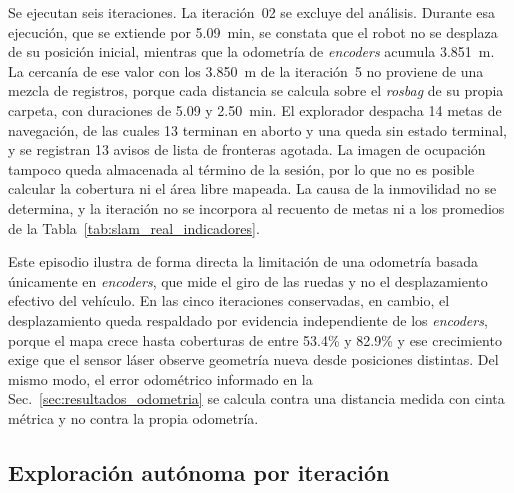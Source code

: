 \begin{appendices}
Se ejecutan seis iteraciones. La iteración~02 se excluye del análisis.
Durante esa ejecución, que se extiende por 5.09~min, se constata que
el robot no se desplaza de su posición inicial, mientras que la odometría de
\textit{encoders} acumula 3.851~m. La cercanía de ese valor con los 3.850~m de la iteración~5 no proviene de una
mezcla de registros, porque cada distancia se calcula sobre el \textit{rosbag} de su
propia carpeta, con duraciones de 5.09 y 2.50~min. El explorador despacha 14 metas de navegación, de
las cuales 13 terminan en aborto y una queda sin estado terminal, y se
registran 13 avisos de lista de fronteras agotada. La imagen de ocupación
tampoco queda almacenada al término de la sesión, por lo que no es posible
calcular la cobertura ni el área libre mapeada. La causa de la inmovilidad no
se determina, y la iteración no se incorpora al recuento de metas ni a los
promedios de la Tabla~\ref{tab:slam_real_indicadores}.

Este episodio ilustra de forma directa la limitación de una odometría basada
únicamente en \textit{encoders}, que mide el giro de las ruedas y no el desplazamiento
efectivo del vehículo. En las cinco iteraciones conservadas, en cambio, el
desplazamiento queda respaldado por evidencia independiente de los \textit{encoders},
porque el mapa crece hasta coberturas de entre 53.4\% y 82.9\% y ese
crecimiento exige que el sensor láser observe geometría nueva desde posiciones
distintas. Del mismo modo, el error odométrico informado en la
Sec.~\ref{sec:resultados_odometria} se calcula contra una distancia medida con
cinta métrica y no contra la propia odometría.

\subsection{Exploración autónoma por iteración}


\end{appendices}
